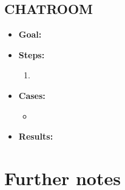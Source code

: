 \subsection{CHATROOM}\label{subsec:chatroom}
\begin{itemize}
    \item \textbf{Goal:}

    \item \textbf{Steps:}
    \begin{enumerate}
        \item

    \end{enumerate}
    \item \textbf{Cases:}
    \begin{itemize}
        \item
    \end{itemize}
    \item \textbf{Results:}

\end{itemize}

\section{Further notes}\label{sec:further-notes}